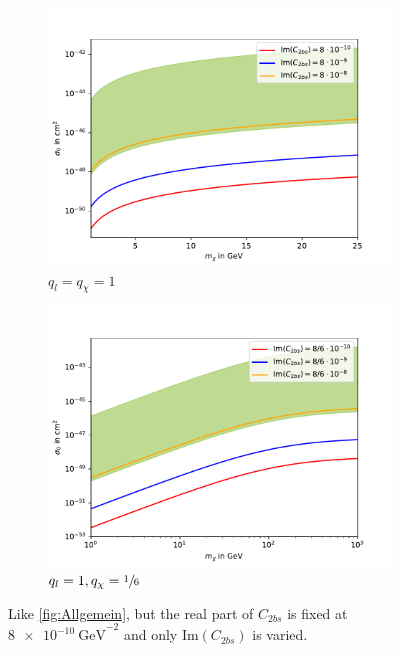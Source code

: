 \begin{figure}
	\centering
	\begin{subfigure}[]{0.8\textwidth}
		\includegraphics[width=\textwidth]{content/graphics/Im11.pdf}
		\caption{$q_l=q_\chi=1$}
		\label{fig:Im11}
	\end{subfigure}
	\begin{subfigure}[]{0.8\textwidth}
		\includegraphics[width=\textwidth]{content/graphics/Im116.pdf}
		\caption{$q_l=1,q_\chi=\sfrac{1}{6}$}
		\label{fig:Im116}
	\end{subfigure}
	\caption{Like \ref{fig:Allgemein}, but the real part of $C_{2bs}$ is fixed at $\SI{8e-10}{\giga\electronvolt}^{-2}$ and only $\text{Im}(C_{2bs})$ is varied.}
	\label{fig:Im}
\end{figure}

